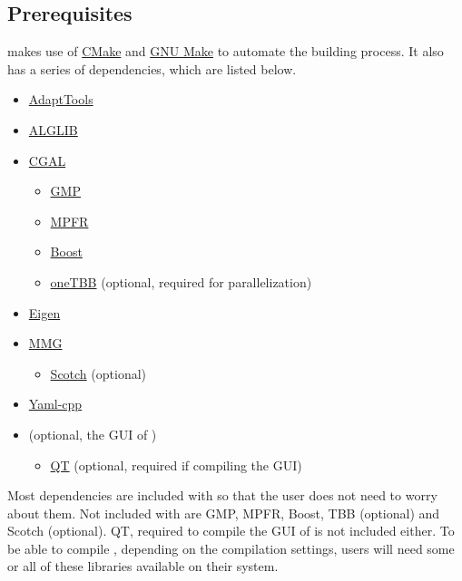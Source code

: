 \subsection{Prerequisites} \label{sec:prerequisites}
\asli{} makes use of \href{http://www.cmake.org}{CMake} and \href{https://www.gnu.org/software/make/}{GNU Make} to automate the building process. It also has a series of dependencies, which are listed below.
\begin{itemize}
	\item \href{https://github.com/ISCDtoolbox/AdaptTools}{AdaptTools}
	\item \href{https://www.alglib.net}{ALGLIB}
	\item \href{https://www.cgal.org}{CGAL}
	\begin{itemize}
		\item \href{https://gmplib.org}{GMP}
		\item \href{https://www.mpfr.org}{MPFR}
		\item \href{https://www.boost.org}{Boost}
		\item \href{http://intel.com/oneTBB}{oneTBB} (optional, required for parallelization)
	\end{itemize}
	\item \href{http://eigen.tuxfamily.org}{Eigen}
	\item \href{https://www.mmgtools.org}{MMG}
	\begin{itemize}
		\item \href{https://gitlab.inria.fr/scotch/scotch}{Scotch} (optional)
	\end{itemize}
	\item \href{https://github.com/jbeder/yaml-cpp}{Yaml-cpp}
	\item \href{https://github.com/tpms-lattice/QASLI}{\qasli{}} (optional, the GUI of \asli{})
	\begin{itemize}
		\item \href{https://www.qt.io}{QT} (optional, required if compiling the GUI)
	\end{itemize}
\end{itemize}

Most dependencies are included with \asli{} so that the user does not need to worry about them. Not included with \asli{} are GMP, MPFR, Boost, TBB (optional) and Scotch (optional). QT, required to compile the GUI of \asli{} is not included either. To be able to compile \asli{}, depending on the compilation settings, users will need some or all of these libraries available on their system.

